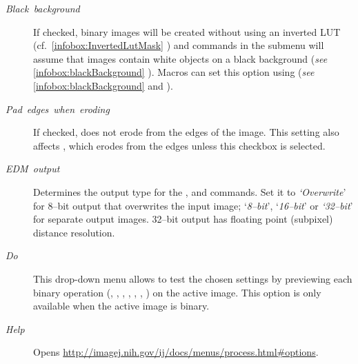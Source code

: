 \begin{description}
\item [{\emph{Black\ background}}] If checked, binary images will be created
without using an inverted LUT (cf.\ \ref{infobox:InvertedLutMask}
) and commands
in the  submenu
will assume that images contain white objects on a black background
(\emph{see} \ref{infobox:blackBackground} ).
Macros can set this option using 
(\emph{see} \ref{infobox:blackBackground} 
and ).
\item [{\emph{Pad}\ \emph{edges}\ \emph{when}\ \emph{eroding}}] If checked,
 does not erode
from the edges of the image. This setting also affects ,
which erodes from the edges unless this checkbox is selected.
\item [{\emph{EDM\ output}}] Determines the output type for the ,
 and 
commands. Set it to \emph{`Overwrite}' for 8--bit output that overwrites
the input image; `\emph{8--bit}', `\emph{16--bit}' or \emph{`32--bit}'
for separate output images. 32--bit output has floating point (subpixel)
distance resolution.
\item [{\emph{Do}}] This drop-down menu allows to test the chosen settings
by previewing each binary operation (,
, ,
, ,
, )
on the active image. This option is only available when the active
image is binary.
\item [{\emph{Help}}] Opens \href{http://imagej.nih.gov/ij/docs/menus/process.html\#options}{http://imagej.nih.gov/ij/docs/menus/process.html\#{}options}.
\end{description}
